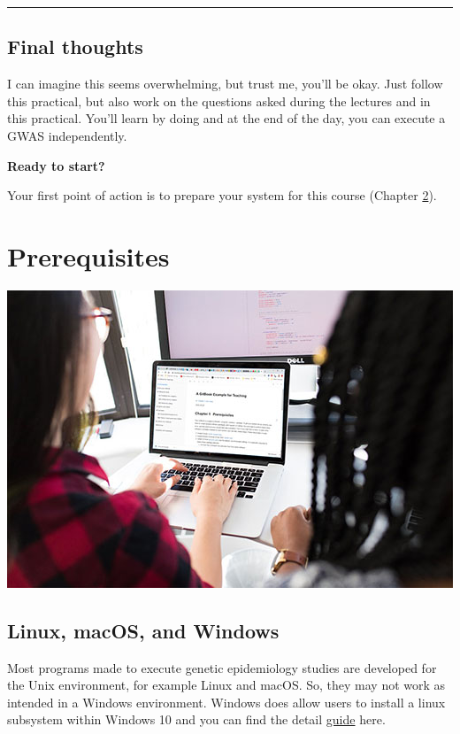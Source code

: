 \documentclass[
]{book}
\begin{document}
\begin{center}\rule{0.5\linewidth}{0.5pt}\end{center}

\hypertarget{final-thoughts}{%
\section{Final thoughts}\label{final-thoughts}}

I can imagine this seems overwhelming, but trust me, you'll be okay. Just follow this practical, but also work on the questions asked during the lectures and in this practical. You'll learn by doing and at the end of the day, you can execute a GWAS independently.

\textbf{Ready to start?}

Your first point of action is to prepare your system for this course (Chapter \ref{prerequisites}).

\hypertarget{prerequisites}{%
\chapter{Prerequisites}\label{prerequisites}}

\includegraphics{./img/using_gitbook.jpeg}

\hypertarget{linux-macos-and-windows}{%
\section{Linux, macOS, and Windows}\label{linux-macos-and-windows}}

Most programs made to execute genetic epidemiology studies are developed for the Unix environment, for example Linux and macOS. So, they may not work as intended in a Windows environment. Windows does allow users to install a linux subsystem within Windows 10 and you can find the detail \href{https://docs.microsoft.com/en-us/windows/wsl/about}{guide} here.
\end{document}
